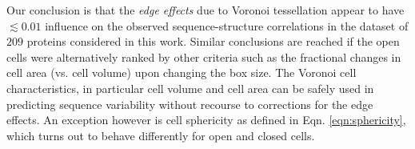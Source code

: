 \documentclass[11pt]{article}
\begin{document}
\begin{appendices}
    Our conclusion is that the {\it edge effects} due to Voronoi tessellation appear to have $\lesssim0.01$ influence on the observed sequence-structure correlations in the dataset of $209$ proteins considered in this work. Similar conclusions are reached if the open cells were alternatively ranked by other criteria such as the fractional changes in cell area (vs. cell volume) upon changing the box size. The Voronoi cell characteristics, in particular cell volume and cell area can be safely used in predicting sequence variability without recourse to corrections for the edge effects. An exception however is cell sphericity as defined in Eqn. \ref{eqn:sphericity}, which turns out to behave differently for open and closed cells. %




\end{appendices}
\end{document}
